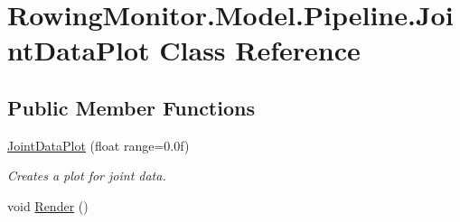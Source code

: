 \hypertarget{class_rowing_monitor_1_1_model_1_1_pipeline_1_1_joint_data_plot}{}\section{Rowing\+Monitor.\+Model.\+Pipeline.\+Joint\+Data\+Plot Class Reference}
\label{class_rowing_monitor_1_1_model_1_1_pipeline_1_1_joint_data_plot}
\subsection*{Public Member Functions}
\begin{DoxyCompactItemize}
\item 
\hyperlink{class_rowing_monitor_1_1_model_1_1_pipeline_1_1_joint_data_plot_ab5f09dd3d3b8ea21748dc9fc89fb15d4}{Joint\+Data\+Plot} (float range=0.\+0f)
\begin{DoxyCompactList}\small\item\em Creates a plot for joint data. \end{DoxyCompactList}\item 
void \hyperlink{class_rowing_monitor_1_1_model_1_1_pipeline_1_1_joint_data_plot_a83387641d5b1ceac07367c3ad42274f9}{Render} ()
\end{DoxyCompactItemize}
